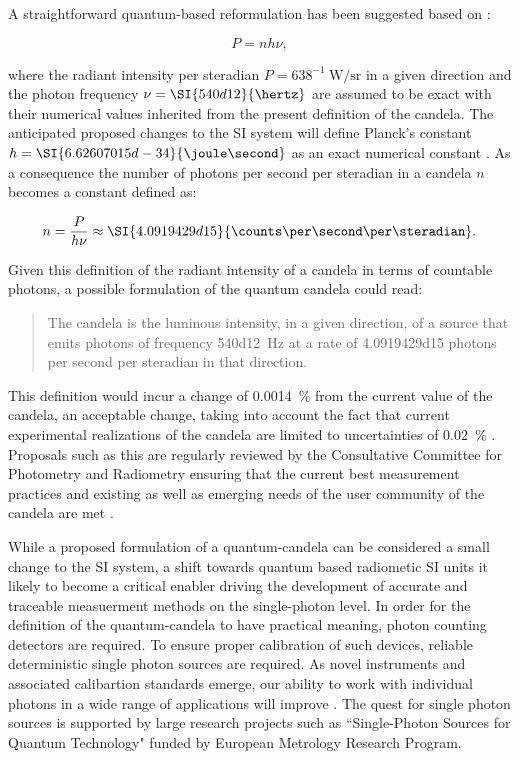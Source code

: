 			A straightforward quantum-based reformulation has been suggested based on \cite{Cheung2007, zwinckels::paper}:

			\begin{equation}
				P = n h \nu,
			\end{equation}

			where the radiant intensity per steradian $P = 638^{-1} \SI{}{\watt\per\steradian}$ in a given direction and the photon frequency $\nu = \SI{540d12}{\hertz}$ are assumed to be exact with their numerical values inherited from the present definition of the candela. The anticipated proposed changes to the SI system will define Planck's constant $h = \SI{6.62607015d-34}{\joule\second}$ as an exact numerical constant \cite{porposal}. As a consequence the number of photons per second per steradian in a candela $n$ becomes a constant defined as:

			\begin{equation}
				n = \frac{P}{h \nu} \approx \SI{4.0919429d15}{\counts\per\second\per\steradian}.
			\end{equation}

		Given this definition of the radiant intensity of a candela in terms of countable photons, a possible formulation of the quantum candela could read:

		\begin{quote}
			The candela is the luminous intensity, in a given direction, of a source that emits photons of frequency \SI{540d12}{\hertz} at a rate of \num{4.0919429d15} photons per second per steradian in that direction.
		\end{quote}

		This definition would incur a change of \SI{0.0014}{\percent} from the current value of the candela, an acceptable change, taking into account the fact that current experimental realizations of the candela are limited to uncertainties of \SI{0.02}{\percent} \cite{Cheung2007}. Proposals such as this are regularly reviewed by the Consultative Committee for Photometry and Radiometry ensuring that the current best measurement practices and existing as well as emerging needs of the user community of the candela are met \cite{zwinckels::paper}.

		While a proposed formulation of a quantum-candela can be considered a small change to the SI system, a shift towards quantum based radiometic SI units it likely to become a critical enabler driving the development of accurate and traceable measuerment methods on the single-photon level. In order for the definition of the quantum-candela to have practical meaning, photon counting detectors are required. To ensure proper calibration of such devices, reliable deterministic single photon sources are required. As novel instruments and associated calibartion standards emerge, our ability to work with individual photons in a wide range of applications will improve \cite{Rodiek2017::1, Rodiek2017::2, Rodiek2017::3, Rodiek2017::4}. The quest for single photon sources is supported by large research projects such as ``Single-Photon Sources for Quantum Technology" funded by European Metrology Research Program.

